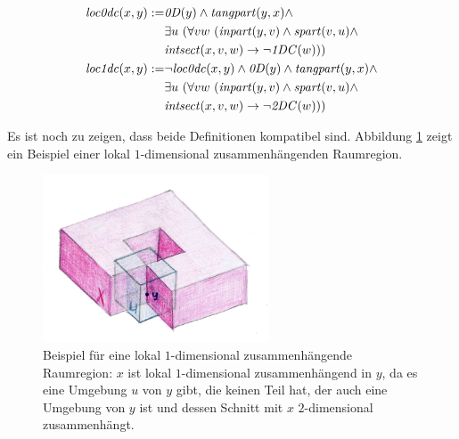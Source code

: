     \begin{dfn}
        \begin{align*}
            \Gloczerodc(x,y) := &\GzeroD(y) \land \Gtangpart(y,x) \land
                                \\
                                &\exists u\ (\forall v w\ (\Ginpart(y,v) \land \Gspart(v,u) \land
                                \\
                                &\Gintersect(x,v,w) \to \neg \GoneDC(w)))
                                \\
            \Gloconedc(x,y) := &\neg \Gloczerodc(x,y) \land \GzeroD(y) \land \Gtangpart(y,x) \land
                                \\
                                &\exists u\ (\forall v w\ (\Ginpart(y,v) \land \Gspart(v,u) \land
                                \\
                                &\Gintersect(x,v,w) \to \neg \GtwoDC(w)))
        \end{align*}

    \end{dfn}
%
    Es ist noch zu zeigen, dass beide Definitionen kompatibel sind.
    Abbildung \ref{fig:loc1dc} zeigt ein Beispiel einer lokal $1$-dimensional zusammenhängenden Raumregion.

    \begin{figure}[ht]
            \centering
            \includegraphics[width=0.6\textwidth]{abb/loc1dc.png}
            \caption[Beispiel für eine lokal $1$-dimensional zusammenhängende Raumregion]{Beispiel für eine lokal $1$-dimensional zusammenhängende Raumregion: $x$ ist lokal $1$-dimensional zusammenhängend in $y$, da es eine Umgebung $u$ von $y$ gibt, die keinen Teil hat, der auch eine Umgebung von $y$ ist und dessen Schnitt mit $x$ $2$-dimensional zusammenhängt.}
            \label{fig:loc1dc}
    \end{figure}
